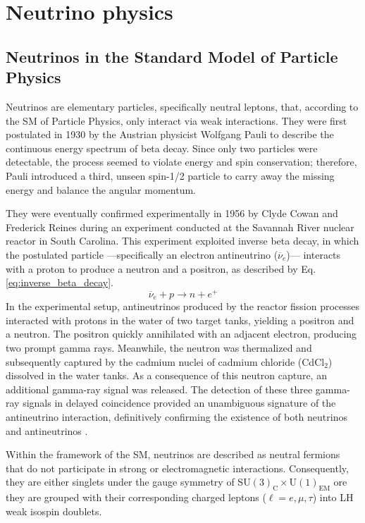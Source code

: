 \chapter{Neutrino physics}
\section{Neutrinos in the Standard Model of Particle Physics}
\label{sec:nuIntro}
Neutrinos are elementary particles, specifically neutral leptons, that, according to the \ac{SM} of Particle Physics, only interact via weak interactions.  
They were first postulated in 1930 by the Austrian physicist Wolfgang Pauli to describe the continuous energy spectrum of beta decay. 
Since only two particles were detectable, the process seemed to violate energy and spin conservation; therefore, Pauli introduced a third, 
unseen spin-1/2 particle to carry away the missing energy and balance the angular momentum.

They were eventually confirmed experimentally in 1956 by Clyde Cowan and Frederick Reines during an experiment conducted at the Savannah River 
nuclear reactor in South Carolina. 
This experiment exploited inverse beta decay, in which the postulated particle —specifically an electron antineutrino ($\overline{\nu}_e$)— 
interacts with a proton to produce a neutron and a positron, as described by Eq. \ref{eq:inverse_beta_decay}.
\begin{equation}
    \label{eq:inverse_beta_decay}
    \overline{\nu}_e + p \rightarrow n + e^{+}
\end{equation}
In the experimental setup, antineutrinos produced by the reactor fission processes interacted with protons in the water of two target tanks, 
yielding a positron and a neutron. The positron quickly annihilated with an adjacent electron, producing two prompt gamma rays. 
Meanwhile, the neutron was thermalized and subsequently captured by the cadmium nuclei of cadmium chloride (CdCl$_2$) dissolved in the water tanks.
As a consequence of this neutron capture, an additional gamma-ray signal was released. The detection of these three gamma-ray signals 
in delayed coincidence provided an unambiguous signature of the antineutrino interaction, definitively confirming the existence of 
both neutrinos and antineutrinos \cite{cowan1956nudetection}.

Within the framework of the \ac{SM}, neutrinos are described as neutral fermions that do not participate in strong or 
electromagnetic interactions. Consequently, they are either singlets under the gauge symmetry of SU$(3)_\text{C} \times \text{U}(1)_\text{EM}$ ore they are grouped with their corresponding charged leptons ($\ell = e, \mu, \tau$) into \ac{LH} weak isospin doublets.


